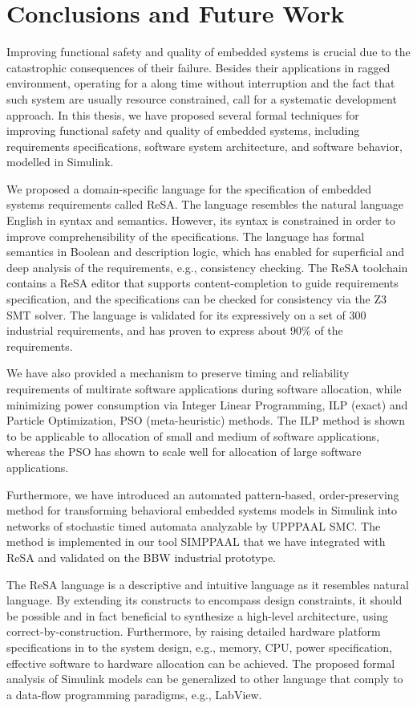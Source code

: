 \chapter{Conclusions and Future Work}
Improving functional safety and quality of embedded systems is crucial due to the catastrophic consequences of their failure. Besides their applications in ragged environment, operating for a along time without interruption and the fact that such system are usually resource constrained, call for a systematic development approach. In this thesis, we have proposed several formal techniques for improving functional safety and quality of embedded systems, including requirements specifications, software system architecture, and software behavior, modelled in Simulink.

We proposed a domain-specific language for the specification of embedded systems requirements called ReSA. The language resembles the natural language English in syntax and semantics. However, its syntax is constrained in order to improve comprehensibility of the specifications. The language has formal semantics in Boolean and description logic, which has enabled for superficial and deep analysis of the requirements, e.g., consistency checking. The ReSA toolchain contains a ReSA editor that supports content-completion to guide requirements specification, and the specifications can be checked for consistency via the Z3 SMT solver. The language is validated for its expressively on a set of 300 industrial requirements, and has proven to express about 90\% of the requirements. 

We have also provided a mechanism to preserve timing and reliability requirements of multirate software applications during software allocation, while minimizing power consumption via Integer Linear Programming, ILP (exact) and Particle Optimization, PSO (meta-heuristic) methods. The ILP method is shown to be applicable to allocation of small and medium of software applications, whereas the PSO has shown to scale well for allocation of large software applications.

Furthermore, we have introduced an automated pattern-based, order-preserving method for transforming behavioral embedded systems models in Simulink into networks of stochastic timed automata analyzable by UPPPAAL SMC. The method is implemented in our tool SIMPPAAL that we have integrated with ReSA and validated on the BBW industrial prototype. 

The ReSA language is a descriptive and intuitive language as it resembles natural language. By extending its constructs to encompass design constraints, it should be possible and in fact beneficial to synthesize a high-level architecture, using correct-by-construction. Furthermore, by raising detailed hardware platform specifications in to the system design, e.g., memory, CPU, power specification, effective software to hardware allocation can be achieved. The proposed formal analysis of Simulink models can be generalized to other language that comply to a data-flow programming paradigms, e.g., LabView. 
